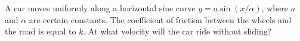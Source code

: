 \item A car moves uniformly along a horizontal sine curve \( y = a \sin (x/\alpha) \), where \( a \) and \( \alpha \) are certain constants. The coefficient of friction between the wheels and the road is equal to \( k \). At what velocity will the car ride without sliding?